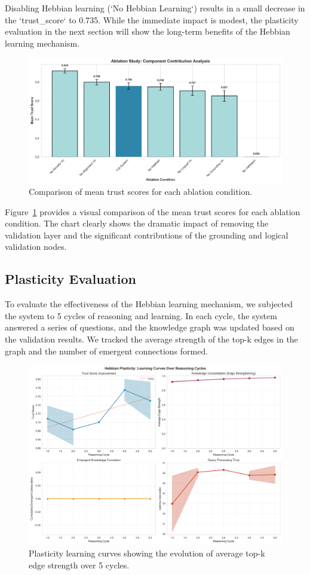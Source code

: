 Disabling Hebbian learning (`No Hebbian Learning`) results in a small decrease in the `trust_score` to 0.735. While the immediate impact is modest, the plasticity evaluation in the next section will show the long-term benefits of the Hebbian learning mechanism.

\begin{figure}[h]
    \centering
    \includegraphics[width=0.8\linewidth]{output/quick_eval_20251027_015729/figures/ablation_comparison.png}
    \caption{Comparison of mean trust scores for each ablation condition.}
    \label{fig:ablation}
\end{figure}

Figure~\ref{fig:ablation} provides a visual comparison of the mean trust scores for each ablation condition. The chart clearly shows the dramatic impact of removing the validation layer and the significant contributions of the grounding and logical validation nodes.

\subsection{Plasticity Evaluation}

To evaluate the effectiveness of the Hebbian learning mechanism, we subjected the system to 5 cycles of reasoning and learning. In each cycle, the system answered a series of questions, and the knowledge graph was updated based on the validation results. We tracked the average strength of the top-k edges in the graph and the number of emergent connections formed.

\begin{figure}[h]
    \centering
    \includegraphics[width=0.8\linewidth]{output/quick_eval_20251027_015729/figures/plasticity_learning_curves.png}
    \caption{Plasticity learning curves showing the evolution of average top-k edge strength over 5 cycles.}
    \label{fig:plasticity_curves}
\end{figure}

